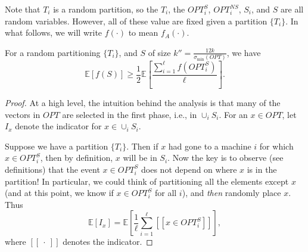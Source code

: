 \documentclass{article}
\newcommand{\E}{\mathbb{E}}
\newcommand{\opt}{OPT}
\begin{document}
Note that $T_i$ is a random partition, so the $T_i$, the $\opt_i^{S}$, $\opt_i^{NS}$, $S_i$, and $S$ are all random variables. However, all of these value are fixed given a partition $\{T_i\}$. In what follows, we will write $f(\cdot)$ to mean $f_A(\cdot)$.

\begin{lemma}\label{lem:opt-s}
For a random partitioning $\{T_i\}$, and $S$ of size $k'' = \frac{12 k}{\sigma_{\min}(OPT)}$, we have
\begin{equation}\label{eq:main-lem-to-show}
\E[f(S)] \ge \frac{1}{2}\E \left[ \frac{\sum_{i=1}^{\ell} f(OPT_i^S)}{\ell}\right].
\end{equation}
\end{lemma}
\begin{proof}
At a high level, the intuition behind the analysis is that many of the vectors in $\opt$ are selected in the first phase, i.e., in $\cup_i S_i$. For an  $x \in \opt$, let $I_x$ denote the indicator for $x \in \cup_i S_i$.

Suppose we have a partition $\{T_i\}$. Then if $x$ had gone to a machine $i$ for which $x \in \opt_i^{S}$, then by definition, $x$ will be in $S_i$. Now the key is to observe (see definitions) that the event $x \in \opt_i^S$ does not depend on where $x$ is in the partition! In particular, we could think of partitioning all the elements except $x$ (and at this point, we know if $x \in \opt_i^S$ for all $i$), and {\em then} randomly place $x$.  Thus
\begin{equation}\label{eq:n14}
  \E[ I_x ] = \E \left[ \frac{1}{\ell} \sum_{i=1}^{\ell} [[x \in \opt_i^S]] \right],
\end{equation}
where $[[~\cdot~]]$ denotes the indicator.


\end{proof}
\end{document}

